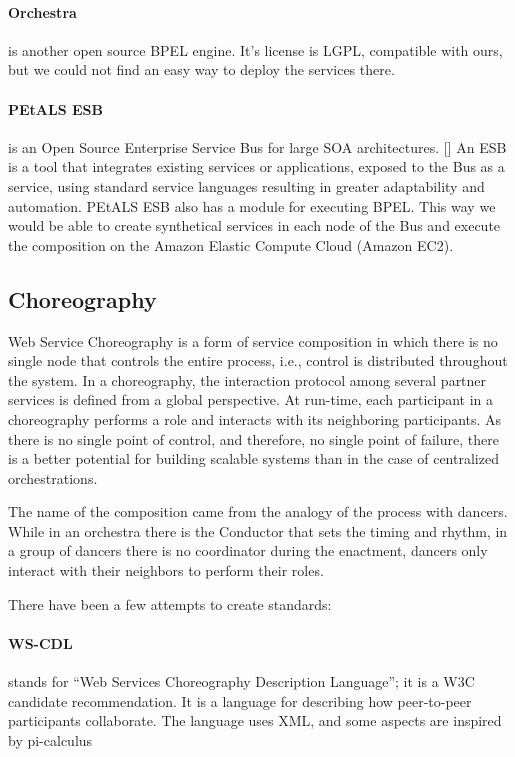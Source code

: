 \paragraph{Orchestra}
is another open source BPEL engine. It's license is LGPL, compatible with ours, but we could not find an easy way to deploy the services there.

\paragraph{PEtALS ESB}
is an Open Source Enterprise Service Bus for large SOA architectures. [\citet{PEtALS}] An ESB is a tool that integrates existing services or applications, exposed to the Bus as a service, using standard service languages resulting in greater adaptability and automation. PEtALS ESB also has a module for executing BPEL. This way we would be able to create synthetical services in each node of the Bus and execute the composition on the Amazon Elastic Compute Cloud (Amazon EC2).


\subsection{Choreography}
Web Service Choreography is a form of service composition in which there is no single node that controls the entire process, i.e., control is distributed throughout the system. In a choreography, the interaction protocol among several partner services is defined from a global perspective. At run-time, each participant in a choreography performs a role and interacts with its neighboring participants. As there is no single point of control, and therefore, no single point of failure, there is a better potential for building scalable systems than in the case of centralized orchestrations.

The name of the composition came from the analogy of the process with dancers. While in an orchestra there is the Conductor that sets the timing and rhythm, in a group of dancers there is no coordinator during the enactment, dancers only interact with their neighbors to perform their roles.

There have been a few attempts to create standards:

\paragraph{WS-CDL}
stands for ``Web Services Choreography Description Language''; it is a W3C candidate recommendation. It is a language for describing how peer-to-peer participants collaborate. The language uses XML, and some aspects are inspired by pi-calculus

